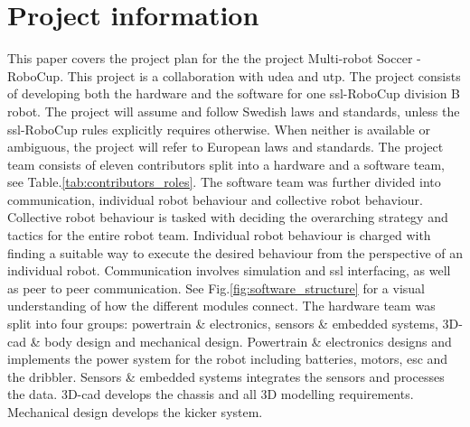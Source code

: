 \section{Project information}
\label{section:project_information}

This paper covers the project plan for the the project Multi-robot Soccer - RoboCup. This project is a collaboration with \ac{udea} and \ac{utp}. The project consists of developing both the hardware and the software for one \ac{ssl}-RoboCup division B robot. The project will assume and follow Swedish laws and standards, unless the \ac{ssl}-RoboCup rules explicitly requires otherwise. When neither is available or ambiguous, the project will refer to European laws and standards.
The project team consists of eleven contributors split into a hardware and a software team, see Table.\:\ref{tab:contributors_roles}. 
The software team was further divided into communication, individual robot behaviour and collective robot behaviour. Collective robot behaviour is tasked with deciding the overarching strategy and tactics for the entire robot team. Individual robot behaviour is charged with finding a suitable way to execute the desired behaviour from the perspective of an individual robot. Communication involves simulation and \ac{ssl} interfacing, as well as peer to peer communication. See Fig.\:\ref{fig:software_structure} for a visual understanding of how the different modules connect.
The hardware team was split into four groups: powertrain \& electronics, sensors \& embedded systems, 3D-\acs{cad} \& body design and mechanical design. Powertrain \& electronics designs and implements the power system for the robot including batteries, motors, \ac{esc} and the dribbler. Sensors \& embedded systems integrates the sensors and processes the data. 3D-\acs{cad} develops the chassis and all 3D modelling requirements. Mechanical design develops the kicker system.

